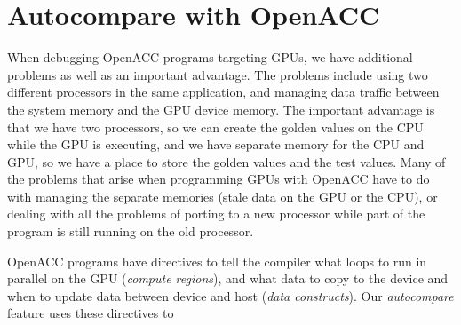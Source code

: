 \section{Autocompare with OpenACC}

When debugging OpenACC programs targeting GPUs, we have additional problems as well as an important advantage.
The problems include using two different processors in the same application, and managing data traffic between the system memory and the GPU device memory.
The important advantage is that we have two processors, so we can create the golden values on the CPU while the GPU is executing, and we have separate memory for the CPU and GPU, so we have a place to store the golden values and the test values.
Many of the problems that arise when programming GPUs with OpenACC have to do with managing the separate memories (stale data on the GPU or the CPU), or dealing with all the problems of porting to a new processor while part of the program is still running on the old processor.

OpenACC programs have directives to tell the compiler what loops to run in parallel on the GPU (\emph{compute regions}), and what data to copy to the device and when to update data between device and host (\emph{data constructs}).
Our \emph{autocompare} feature uses these directives to 


